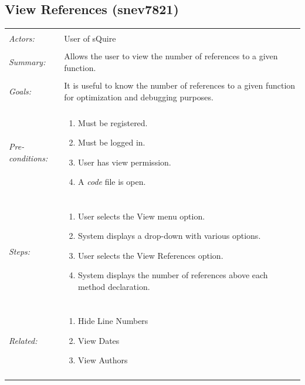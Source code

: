 \documentclass[11pt]{report}
\begin{document}
\subsection{View References (snev7821)}
\begin{tabular}{ p{2cm} p{12cm} }
\hline
\\
	\textit{Actors:} & User of sQuire \\
	\\
	\textit{Summary:} & Allows the user to view the number of references to a given function. \\
	\\
	\textit{Goals:} & It is useful to know the number of references to a given function for optimization and debugging purposes. \\
	\\
	\textit{Pre-conditions:} &  \begin{enumerate}
		\item Must be registered.
		\item Must be logged in.
		\item User has view permission.
		\item A \textit{code} file is open.
	\end{enumerate} \\
	\\
	\textit{Steps:} & \begin{enumerate}
		\item User selects the View menu option.
		\item System displays a drop-down with various options.
		\item User selects the View References option.
		\item System displays the number of references above each method declaration.
	\end{enumerate} \\
	\\
	\textit{Related:} & \begin{enumerate}
		\item Hide Line Numbers
		\item View Dates
		\item View Authors
	\end{enumerate} \\
	\\
\hline
\end{tabular}
\newpage
\end{document}
